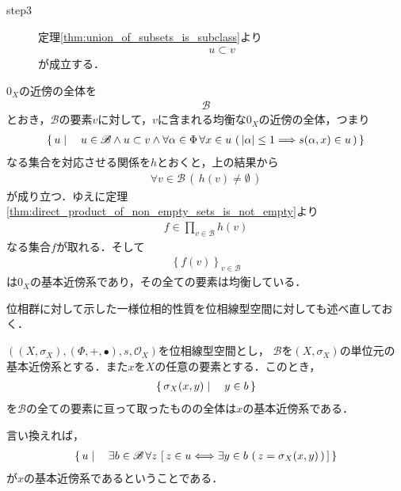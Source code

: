 \begin{sketch}
\begin{description}
			\item[step3] 定理\ref{thm:union_of_subsets_is_subclass}より
				\begin{align}
					u \subset v
				\end{align}
				が成立する．
		\end{description}
		$0_X$の近傍の全体を
		\begin{align}
			\mathscr{B}
		\end{align}
		とおき，$\mathscr{B}$の要素$v$に対して，$v$に含まれる均衡な$0_X$の近傍の全体，つまり
		\begin{align}
			\left\{\, u \mid \quad u \in \mathscr{B} \wedge u \subset v \wedge 
			\forall \alpha \in \Phi\, \forall x \in u\, \left(\, |\alpha| \leq 1 \Longrightarrow
			s(\alpha,x) \in u\, \right)\, \right\}
		\end{align}
		なる集合を対応させる関係を$h$とおくと，上の結果から
		\begin{align}
			\forall v \in \mathscr{B}\, \left(\, h(v) \neq \emptyset\, \right)
		\end{align}
		が成り立つ．ゆえに定理\ref{thm:direct_product_of_non_empty_sets_is_not_empty}より
		\begin{align}
			f \in \prod_{v \in \mathscr{B}} h(v)
		\end{align}
		なる集合$f$が取れる．そして
		\begin{align}
			\left\{f(v)\right\}_{v \in \mathscr{B}}
		\end{align}
		は$0_X$の基本近傍系であり，その全ての要素は均衡している．
		\QED
	\end{sketch}
	
	位相群に対して示した一様位相的性質を位相線型空間に対しても述べ直しておく．
	
	\begin{screen}
		\begin{thm}[位相線型空間の位相は局所基で決まる]
		\label{thm:topologies_on_topological_vector_spaces_are_invariant}
			$\left(\left(X,\sigma_X\right),(\Phi,+,\bullet),s,\mathscr{O}_X\right)$を位相線型空間とし，
			$\mathscr{B}$を$\left(X,\sigma_X\right)$の単位元の基本近傍系とする．また$x$を$X$の任意の要素とする．このとき，
			\begin{align}
				\left\{\, \sigma_X(x,y) \mid \quad y \in b\, \right\}
			\end{align}
			を$\mathscr{B}$の全ての要素に亘って取ったものの全体は$x$の基本近傍系である．
		\end{thm}
	\end{screen}
	
	言い換えれば，
	\begin{align}
		\left\{\, u \mid \quad \exists b \in \mathscr{B}\, 
		\forall z\, \left[\, z \in u \Longleftrightarrow \exists y \in b\, \left(\, z=\sigma_X(x,y)\, \right) \, \right]\, \right\}
		\label{fom:thm_topologies_on_topological_vector_spaces_are_invariant}
	\end{align}
	が$x$の基本近傍系であるということである．
	
